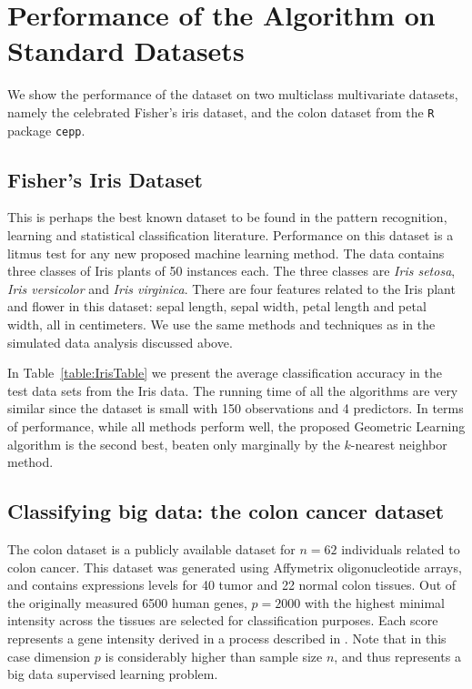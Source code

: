 \documentclass[twoside]{article}
\begin{document}
 


\section{Performance of the Algorithm on Standard Datasets}
\label{sec:RealData}


We show the performance of the dataset on two multiclass multivariate datasets, namely 
the celebrated
Fisher's iris dataset,  and the colon dataset from the {\tt R} package {\tt cepp}. 


\subsection{Fisher's Iris Dataset}

This is perhaps the best known dataset to be found in the 
pattern recognition, learning and statistical classification literature. 
Performance on this dataset is a litmus test for any new proposed 
machine learning method. The data contains three classes of Iris plants
 of 50 instances each. The three classes are {\it Iris setosa}, 
 {\it Iris versicolor} 
 and {\it Iris virginica}. There are four features related to the Iris plant  and flower 
 in this dataset: sepal length, sepal width, petal length and petal width, all 
 in centimeters. We use the same methods and techniques as in the simulated 
 data analysis discussed above. 
 
 
 

In Table~\ref{table:IrisTable} we present the average classification accuracy 
in the test data sets from the Iris data.  The running time of all the algorithms 
are very similar since the dataset is small with 150 observations and 4 predictors.
In terms of performance, while all methods perform well, the proposed Geometric Learning
algorithm is the second best, beaten only marginally by the $k$-nearest neighbor method. 


\subsection{Classifying big data: the colon cancer dataset}

The colon dataset is a publicly available dataset for $n = 62$ individuals related to 
colon cancer. This dataset was generated using Affymetrix oligonucleotide arrays, and  
contains expressions levels for 40 tumor and 22 normal colon tissues. Out of the 
originally measured 6500 human genes, $ p = 2000$ with the highest minimal intensity 
across the tissues are selected for classification purposes. Each score represents a gene 
intensity derived in a process described in \cite{Alonetal99}. Note that in this case 
dimension $p$ is considerably higher than sample size $n$, and thus represents a big 
data  supervised learning problem.
\end{document}

